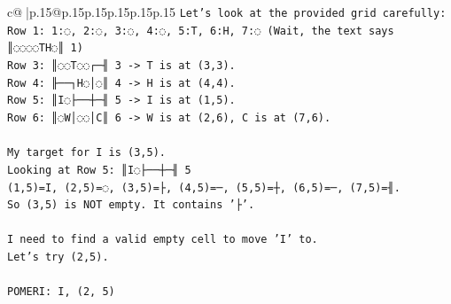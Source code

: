 \documentclass{article}
\begin{document}
{\begin{supertabular}{c@{$\;$}|p{.15\linewidth}@{}p{.15\linewidth}p{.15\linewidth}p{.15\linewidth}p{.15\linewidth}p{.15\linewidth}}
{{{\texttt{Let's look at the provided grid carefully:} \\
\texttt{Row 1: 1:◌, 2:◌, 3:◌, 4:◌, 5:T, 6:H, 7:◌ (Wait, the text says ║◌◌◌◌TH◌║ 1)} \\
\texttt{Row 3: ║◌◌T◌◌┌─╢ 3 {-}> T is at (3,3).} \\
\texttt{Row 4: ╟──┐H◌│◌║ 4 {-}> H is at (4,4).} \\
\texttt{Row 5: ║I◌├──┼─╢ 5 {-}> I is at (1,5).} \\
\texttt{Row 6: ║◌W│◌◌│C║ 6 {-}> W is at (2,6), C is at (7,6).} \\
\\ 
\texttt{My target for I is (3,5).} \\
\texttt{Looking at Row 5: ║I◌├──┼─╢ 5} \\
\texttt{(1,5)=I, (2,5)=◌, (3,5)=├, (4,5)=─, (5,5)=┼, (6,5)=─, (7,5)=╢.} \\
\texttt{So (3,5) is NOT empty. It contains '├'.} \\
\\ 
\texttt{I need to find a valid empty cell to move 'I' to.} \\
\texttt{Let's try (2,5).} \\
\\ 
\texttt{POMERI: I, (2, 5)} \\
            }
        }
    }
     \\ \\


\end{supertabular}}
\end{document}

